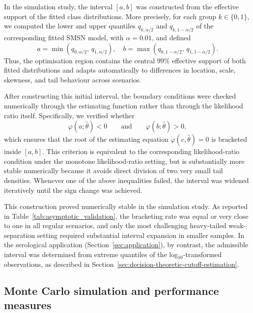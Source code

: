 \documentclass[11pt,a4paper]{article}
\theoremstyle{definition}
\theoremstyle{remark}
\newcommand{\1}{\mathbf{1}}
\begin{document}
In the simulation study, the interval $[a,b]$ was constructed from the effective support of the fitted class distributions. More precisely, for each group $k\in\{0,1\}$, we computed the lower and
upper quantiles $q_{k,\alpha/2}$ and $q_{k,1-\alpha/2}$ of the corresponding fitted SMSN model, with $\alpha=0.01$, and defined
\[
a=\min(q_{0,\alpha/2},\,q_{1,\alpha/2}),
\quad
b=\max(q_{0,1-\alpha/2},\,q_{1,1-\alpha/2}).
\]
Thus, the optimisation region contains the central $99\%$ effective
support of both fitted distributions and adapts automatically to
differences in location, scale, skewness, and tail behaviour across
scenarios.

After constructing this initial interval, the boundary conditions were checked numerically through the estimating function rather than through the likelihood ratio itself. Specifically, we verified whether
\[
\varphi(a;\hat\theta)<0
\qquad\text{and}\qquad
\varphi(b;\hat\theta)>0,
\]
which ensures that the root of the estimating equation
$\varphi(c,\hat\theta)=0$ is bracketed inside $[a,b]$. This criterion is equivalent to the corresponding likelihood-ratio condition under the monotone likelihood-ratio setting, but is substantially more
stable numerically because it avoids direct division of two very small tail densities. Whenever one of the above inequalities failed, the interval was widened iteratively until the sign change was achieved.

This construction proved numerically stable in the simulation study.
As reported in Table~\ref{tab:asymptotic_validation}, the bracketing rate was equal or very close to one in all regular scenarios, and only the most challenging heavy-tailed weak-separation setting required
substantial interval expansion in smaller samples. In the serological
application (Section~\ref{sec:application}), by contrast, the admissible interval was determined from extreme quantiles of the log$_{10}$-transformed observations, as described in Section~\ref{sec:decision-theoretic-cutoff-estimation}.

\subsection{Monte Carlo simulation and performance measures}
\end{document}
